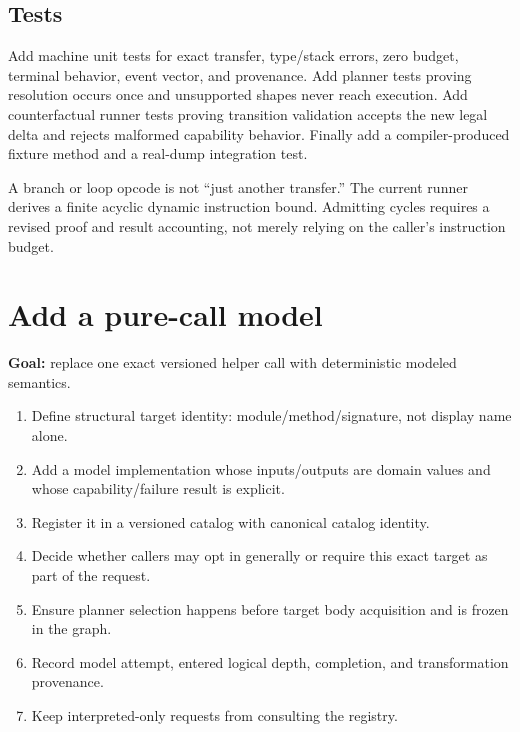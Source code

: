 \documentclass[11pt,oneside,openany]{book}
\begin{document}
\subsection{Tests}

Add machine unit tests for exact transfer, type/stack errors, zero budget, terminal behavior, event vector, and provenance. Add planner tests proving resolution occurs once and unsupported shapes never reach execution. Add counterfactual runner tests proving transition validation accepts the new legal delta and rejects malformed capability behavior. Finally add a compiler-produced fixture method and a real-dump integration test.

\begin{warningbox}
A branch or loop opcode is not ``just another transfer.'' The current runner derives a finite acyclic dynamic instruction bound. Admitting cycles requires a revised proof and result accounting, not merely relying on the caller's instruction budget.
\end{warningbox}

\section{Add a pure-call model}

\begin{recipebox}
\textbf{Goal:} replace one exact versioned helper call with deterministic modeled semantics.
\end{recipebox}

\begin{enumerate}
  \item Define structural target identity: module/method/signature, not display name alone.
  \item Add a model implementation whose inputs/outputs are domain values and whose capability/failure result is explicit.
  \item Register it in a versioned catalog with canonical catalog identity.
  \item Decide whether callers may opt in generally or require this exact target as part of the request.
  \item Ensure planner selection happens before target body acquisition and is frozen in the graph.
  \item Record model attempt, entered logical depth, completion, and transformation provenance.
  \item Keep interpreted-only requests from consulting the registry.
\end{enumerate}
\end{document}
